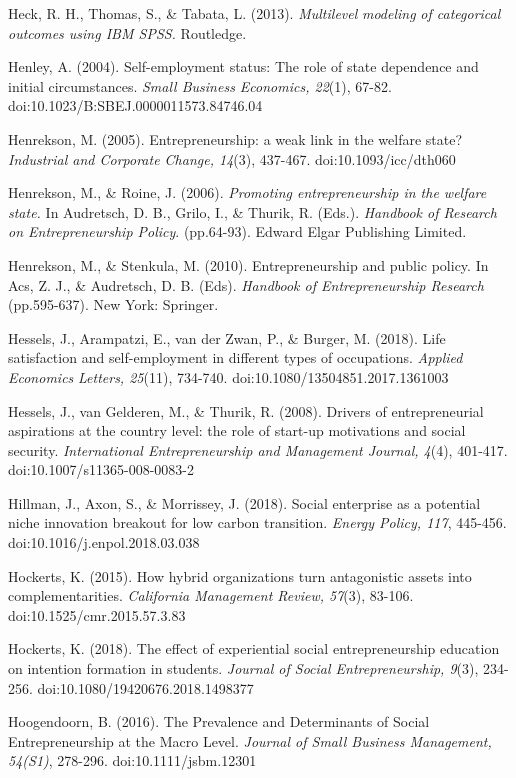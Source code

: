 \documentclass{article}
\begin{document}
Heck, R. H., Thomas, S., \& Tabata, L. (2013). \emph{Multilevel }\emph{modeling}\emph{ of categorical outcomes using IBM SPSS.} Routledge.

Henley, A. (2004). Self-employment status: The role of state dependence and initial circumstances. \emph{Small Business Economics, 22}(1), 67-82. doi:10.1023/B:SBEJ.0000011573.84746.04

Henrekson, M. (2005). Entrepreneurship: a weak link in the welfare state? \emph{Industrial and Corporate Change, 14}(3), 437-467. doi:10.1093/icc/dth060

Henrekson, M., \& Roine, J. (2006). \emph{Promoting entrepreneurship in the welfare state.} In Audretsch, D. B., Grilo, I., \& Thurik, R. (Eds.). \emph{Handbook of Research on Entrepreneurship Policy}. (pp.64-93). Edward Elgar Publishing Limited.

Henrekson, M., \& Stenkula, M. (2010). Entrepreneurship and public policy. In Acs, Z. J., \& Audretsch, D. B. (Eds). \emph{Handbook of Entrepreneurship Research} (pp.595-637). New York: Springer.

Hessels, J., Arampatzi, E., van der Zwan, P., \& Burger, M. (2018). Life satisfaction and self-employment in different types of occupations. \emph{Applied}\emph{ }\emph{Economics}\emph{ Letters, 25}(11), 734-740. doi:10.1080/13504851.2017.1361003

Hessels, J., van Gelderen, M., \& Thurik, R. (2008). Drivers of entrepreneurial aspirations at the country level: the role of start-up motivations and social security. \emph{International Entrepreneurship and Management Journal, 4}(4), 401-417. doi:10.1007/s11365-008-0083-2 

Hillman, J., Axon, S., \& Morrissey, J. (2018). Social enterprise as a potential niche innovation breakout for low carbon transition. \emph{Energy Policy, 117}, 445-456. doi:10.1016/j.enpol.2018.03.038

Hockerts, K. (2015). How hybrid organizations turn antagonistic assets into complementarities. \emph{California Management Review, 57}(3), 83-106. doi:10.1525/cmr.2015.57.3.83

Hockerts, K. (2018). The effect of experiential social entrepreneurship education on intention formation in students. \emph{Journal of Social Entrepreneurship, 9}(3), 234-256. doi:10.1080/19420676.2018.1498377

Hoogendoorn, B. (2016). The Prevalence and Determinants of Social Entrepreneurship at the Macro Level. \emph{Journal of Small Business Management, 54(S1)}, 278-296. doi:10.1111/jsbm.12301
\end{document}
